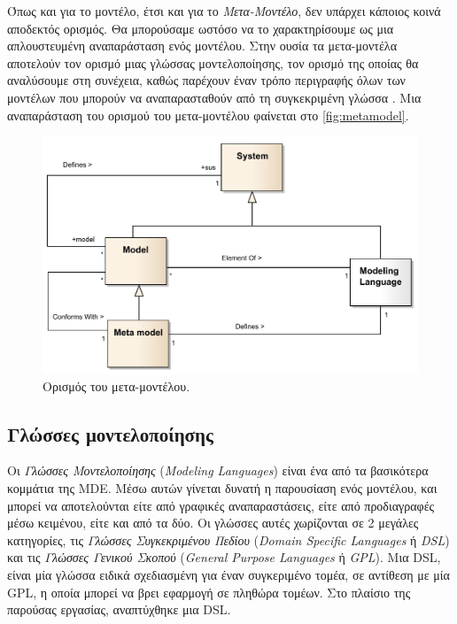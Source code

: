 Όπως και για το μοντέλο, έτσι και για το \textit{Μετα-Μοντέλο}, δεν υπάρχει κάποιος κοινά αποδεκτός ορισμός. Θα μπορούσαμε ωστόσο να το χαρακτηρίσουμε ως μια απλουστευμένη αναπαράσταση ενός μοντέλου. Στην ουσία τα μετα-μοντέλα αποτελούν τον ορισμό μιας γλώσσας μοντελοποίησης, τον ορισμό της οποίας θα αναλύσουμε στη συνέχεια, καθώς παρέχουν έναν τρόπο περιγραφής όλων των μοντέλων που μπορούν να αναπαρασταθούν από τη συγκεκριμένη γλώσσα \cite{bib:brambilla_2012}. Μια αναπαράσταση του ορισμού του μετα-μοντέλου φαίνεται στο \autoref{fig:metamodel}.

\begin{figure}[!ht]
	\centering
	\includegraphics[width=1\textwidth]{./images/chapter2/metamodel.png}
	\caption{Ορισμός του μετα-μοντέλου.}
	\label{fig:metamodel}
\end{figure}

\subsection{Γλώσσες μοντελοποίησης}
\label{subsec:dsls}

Οι \textit{Γλώσσες Μοντελοποίησης} (\textit{Modeling Languages}) είναι ένα από τα βασικότερα κομμάτια της MDE. Μέσω αυτών γίνεται δυνατή η παρουσίαση ενός μοντέλου, και μπορεί να αποτελούνται είτε από γραφικές αναπαραστάσεις, είτε από προδιαγραφές μέσω κειμένου, είτε και από τα δύο. Οι γλώσσες αυτές χωρίζονται σε 2 μεγάλες κατηγορίες, τις \textit{Γλώσσες Συγκεκριμένου Πεδίου} (\textit{Domain Specific Languages} ή \textit{DSL}) και τις \textit{Γλώσσες Γενικού Σκοπού} (\textit{General Purpose Languages} ή \textit{GPL}). Μια DSL, είναι μία γλώσσα ειδικά σχεδιασμένη για έναν συγκεριμένο τομέα, σε αντίθεση με μία GPL, η οποία μπορεί να βρει εφαρμογή σε πληθώρα τομέων. Στο πλαίσιο της παρούσας εργασίας, αναπτύχθηκε μια DSL.

